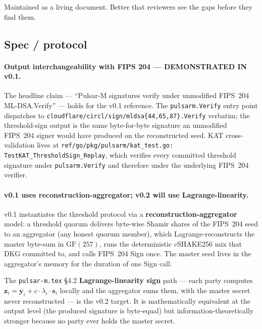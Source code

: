 
Maintained as a living document. Better that reviewers see the gaps
before they find them.

\subsection{Spec / protocol}

\paragraph{Output interchangeability with FIPS 204 --- DEMONSTRATED
IN v0.1.}
The headline claim --- ``Pulsar-M signatures verify under unmodified
FIPS~204 ML-DSA.Verify'' --- holds for the v0.1 reference. The
\texttt{pulsarm.Verify} entry point dispatches to
\texttt{cloudflare/circl/sign/mldsa\{44,65,87\}.Verify} verbatim; the
threshold-sign output is the same byte-for-byte signature an
unmodified FIPS~204 signer would have produced on the reconstructed
seed. KAT cross-validation lives at
\texttt{ref/go/pkg/pulsarm/kat\_test.go:
TestKAT\_ThresholdSign\_Replay}, which verifies every committed
threshold signature under \texttt{pulsarm.Verify} and therefore
under the underlying FIPS~204 verifier.

\paragraph{v0.1 uses reconstruction-aggregator; v0.2 will use
Lagrange-linearity.}
v0.1 instantiates the threshold protocol via a
\textbf{reconstruction-aggregator} model: a threshold quorum
delivers byte-wise Shamir shares of the FIPS~204 seed to an
aggregator (any honest quorum member), which Lagrange-reconstructs
the master byte-sum in $\mathrm{GF}(257)$, runs the deterministic
cSHAKE256 mix that DKG committed to, and calls FIPS~204 Sign once.
The master seed lives in the aggregator's memory for the duration of
one Sign call.

The \texttt{pulsar-m.tex} \S4.2 \textbf{Lagrange-linearity sign}
path --- each party computes $\mathbf{z}_i = \mathbf{y}_i + c \cdot
\lambda_i \cdot \mathbf{s}_i$ locally and the aggregator sums them,
with the master secret never reconstructed --- is the v0.2 target.
It is mathematically equivalent at the output level (the produced
signature is byte-equal) but information-theoretically stronger
because no party ever holds the master secret.


